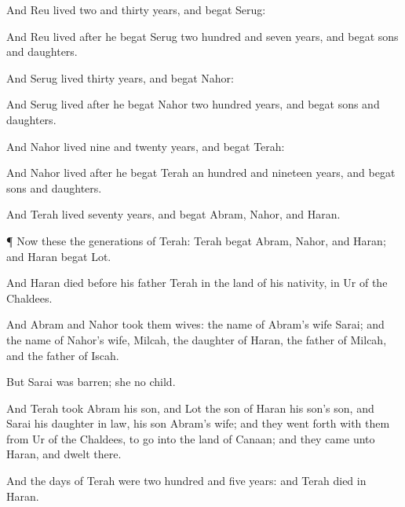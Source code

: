 {And
Reu
lived
two and
thirty
years, and
begat
Serug:

And
Reu
lived
after he
begat
Serug two
hundred and
seven
years, and
begat
sons and
daughters.

And
Serug
lived
thirty
years, and
begat
Nahor:

And
Serug
lived
after he
begat
Nahor two
hundred
years, and
begat
sons and
daughters.

And
Nahor
lived
nine and
twenty
years, and
begat
Terah:

And
Nahor
lived
after he
begat
Terah an
hundred and
nineteen
years, and
begat
sons and
daughters.

And
Terah
lived
seventy
years, and
begat
Abram,
Nahor, and
Haran.


\par }{\PP {}¶ Now these
{} the
generations of
Terah:
Terah
begat
Abram,
Nahor, and
Haran; and
Haran
begat
Lot.

And
Haran
died
before his
father
Terah in the
land of his
nativity, in
Ur of the
Chaldees.

And
Abram and
Nahor
took them
wives: the
name of
Abram’s
wife
{}
Sarai; and the
name of
Nahor’s
wife,
Milcah, the
daughter of
Haran, the
father of
Milcah, and the
father of
Iscah.

But
Sarai was
barren; she
{} no
child.

And
Terah
took
Abram his
son, and
Lot the
son of
Haran his
son’s
son, and
Sarai his daughter in
law, his
son
Abram’s
wife; and they went
forth with them from
Ur of the
Chaldees, to
go into the
land of
Canaan; and they
came unto
Haran, and
dwelt there.

And the
days of
Terah were two
hundred and
five
years: and
Terah
died in
Haran.




\par }
